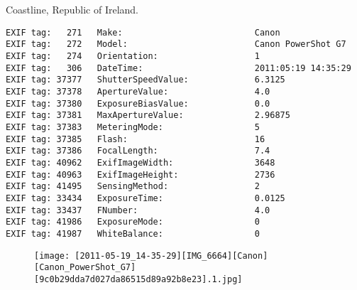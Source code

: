\section{\protect{}}
\noindent Coastline, Republic of Ireland.
\noindent
\begin{lstlisting}
EXIF tag:   271   Make:                          Canon
EXIF tag:   272   Model:                         Canon PowerShot G7
EXIF tag:   274   Orientation:                   1
EXIF tag:   306   DateTime:                      2011:05:19 14:35:29
EXIF tag: 37377   ShutterSpeedValue:             6.3125
EXIF tag: 37378   ApertureValue:                 4.0
EXIF tag: 37380   ExposureBiasValue:             0.0
EXIF tag: 37381   MaxApertureValue:              2.96875
EXIF tag: 37383   MeteringMode:                  5
EXIF tag: 37385   Flash:                         16
EXIF tag: 37386   FocalLength:                   7.4
EXIF tag: 40962   ExifImageWidth:                3648
EXIF tag: 40963   ExifImageHeight:               2736
EXIF tag: 41495   SensingMethod:                 2
EXIF tag: 33434   ExposureTime:                  0.0125
EXIF tag: 33437   FNumber:                       4.0
EXIF tag: 41986   ExposureMode:                  0
EXIF tag: 41987   WhiteBalance:                  0

\end{lstlisting}
\clearpage
\begin{figure}
\raggedleft
\texttt{[image: [2011-05-19\_14-35-29][IMG\_6664][Canon][Canon\_PowerShot\_G7][9c0b29dda7d027da86515d89a92b8e23].1.jpg]}
\end{figure}


\clearpage

